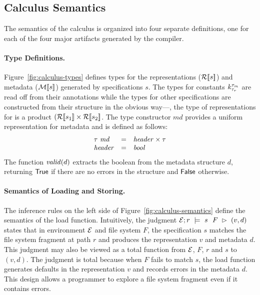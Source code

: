 \subsection{Calculus Semantics}
%
The semantics of the calculus is organized into four separate
definitions, one for each of the four major artifacts generated by the
\forest{} compiler.

\paragraph*{Type Definitions.}
Figure~\ref{fig:calculus-types} defines types for the representations
($\repty{s}$) and metadata ($\mdty{s}$) generated by specifications
$s$. The types for constants $\Sk$ are read off from their annotations
while the types for other specifications are constructed from their
structure in the obvious way---\eg, the type of representations for
 is a product $(\repty{s_1} \times
\repty{s_2}$. The type constructor $\mathit{md}$ provides a uniform
representation for metadata and is defined as follows:
\[
\begin{array}{lcl}
\tau~\mathit{md} & = & \typ{header} \times \tau \\
\typ{header} & = & \typ{bool} 
\end{array}
\]
The function $\valid{d}$ extracts the boolean from the metadata
structure $d$, returning $\True$ if there are no errors in the
structure and $\False$ otherwise. 

\paragraph*{Semantics of Loading and Storing.}
The inference rules on the left side of
Figure~\ref{fig:calculus-semantics} define the semantics of the load
function. Intuitively, the judgment $\load{\Env}{F}{r}{s}{v,d}$ states
that in environment $\Env$ and file system $F$, the specification $s$
matches the file system fragment at path $r$ and produces the
representation $v$ and metadata $d$. This judgment may also be viewed
as a total function from $\Env$, $F$, $r$ and $s$ to $(v,d)$. The
judgment is total because when $F$ fails to match $s$, the load
function generates defaults in the representation $v$ and records
errors in the metadata $d$.  This design allows a programmer to
explore a file system fragment even if it contains errors.


